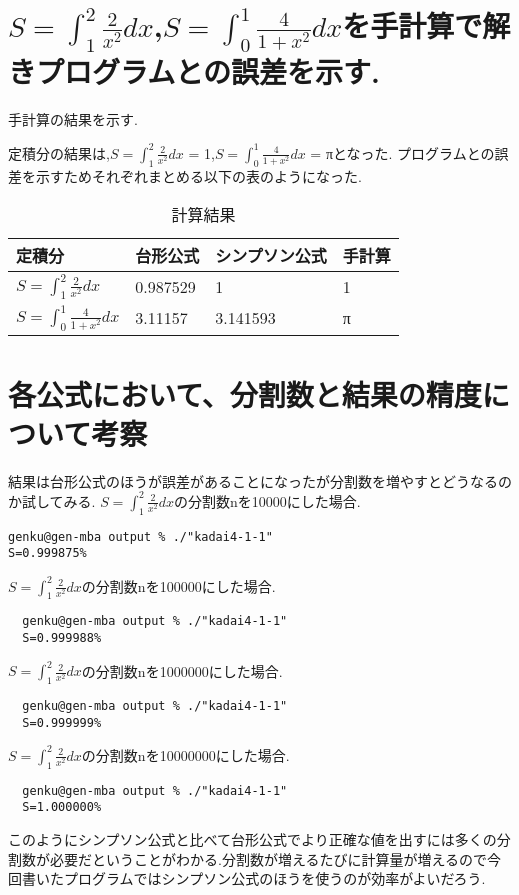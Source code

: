\documentclass[a4j,10pt,dvipdfmx]{jarticle}
\begin{document}
\section{$S=\int_{1}^{2}\frac{2}{x^2}dx$,$S=\int_{0}^{1}\frac{4}{1+x^2}dx$を手計算で解きプログラムとの誤差を示す.}
手計算の結果を示す.

定積分の結果は,$S=\int_{1}^{2}\frac{2}{x^2}dx$ = 1,$S=\int_{0}^{1}\frac{4}{1+x^2}dx$ = πとなった.
プログラムとの誤差を示すためそれぞれまとめる以下の表のようになった.
\begin{table}[H]
  \label{7}
  \begin{center}
  \caption{計算結果}
  \begin{tabular}{|l|l|l|l|}
  \hline
  定積分 & 台形公式 & シンプソン公式 & 手計算 \\ \hline
  $S=\int_{1}^{2}\frac{2}{x^2}dx$ &0.987529 &1 & 1 \\ \hline
  $S=\int_{0}^{1}\frac{4}{1+x^2}dx$&3.11157 & 3.141593 & π \\ \hline
\end{tabular}
\end{center}
\end{table}
\section{各公式において、分割数と結果の精度について考察}
結果は台形公式のほうが誤差があることになったが分割数を増やすとどうなるのか試してみる.
$S=\int_{1}^{2}\frac{2}{x^2}dx$の分割数nを10000にした場合.
\begin{verbatim}
genku@gen-mba output % ./"kadai4-1-1"
S=0.999875%
\end{verbatim}
$S=\int_{1}^{2}\frac{2}{x^2}dx$の分割数nを100000にした場合.
\begin{verbatim}
  genku@gen-mba output % ./"kadai4-1-1"
  S=0.999988% 
\end{verbatim}
$S=\int_{1}^{2}\frac{2}{x^2}dx$の分割数nを1000000にした場合.
\begin{verbatim}
  genku@gen-mba output % ./"kadai4-1-1"
  S=0.999999%  
\end{verbatim}
$S=\int_{1}^{2}\frac{2}{x^2}dx$の分割数nを10000000にした場合.
\begin{verbatim}
  genku@gen-mba output % ./"kadai4-1-1"
  S=1.000000%
\end{verbatim}
このようにシンプソン公式と比べて台形公式でより正確な値を出すには多くの分割数が必要だということがわかる.分割数が増えるたびに計算量が増えるので今回書いたプログラムではシンプソン公式のほうを使うのが効率がよいだろう.
\end{document}
